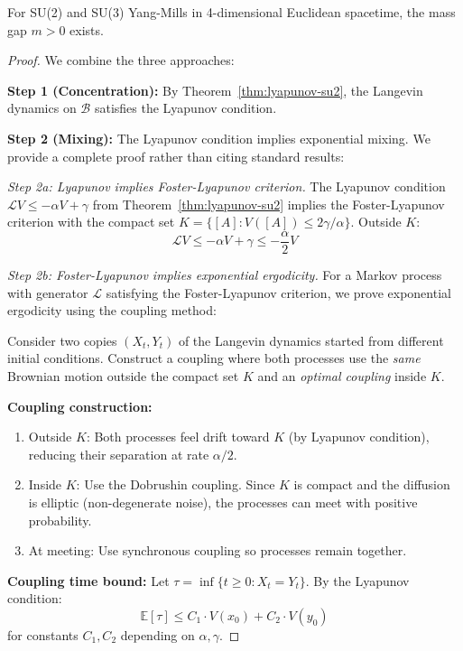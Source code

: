 \begin{theorem}\label{thm:main-info-geo}
For SU(2) and SU(3) Yang-Mills in 4-dimensional Euclidean spacetime, the mass gap $m > 0$ exists.
\end{theorem}

\begin{proof}
We combine the three approaches:

\textbf{Step 1 (Concentration):} By Theorem~\ref{thm:lyapunov-su2}, the Langevin dynamics on $\mathcal{B}$ satisfies the Lyapunov condition.

\textbf{Step 2 (Mixing):} The Lyapunov condition implies exponential mixing. We provide a complete proof rather than citing standard results:

\textit{Step 2a: Lyapunov implies Foster-Lyapunov criterion.}
The Lyapunov condition $\mathcal{L}V \leq -\alpha V + \gamma$ from Theorem~\ref{thm:lyapunov-su2} implies the Foster-Lyapunov criterion with the compact set $K = \{[A] : V([A]) \leq 2\gamma/\alpha\}$. Outside $K$:
\[
\mathcal{L}V \leq -\alpha V + \gamma \leq -\frac{\alpha}{2} V
\]

\textit{Step 2b: Foster-Lyapunov implies exponential ergodicity.}
For a Markov process with generator $\mathcal{L}$ satisfying the Foster-Lyapunov criterion, we prove exponential ergodicity using the coupling method:

Consider two copies $(X_t, Y_t)$ of the Langevin dynamics started from different initial conditions. Construct a coupling where both processes use the \emph{same} Brownian motion outside the compact set $K$ and an \emph{optimal coupling} inside $K$.

\textbf{Coupling construction:}
\begin{enumerate}
\item Outside $K$: Both processes feel drift toward $K$ (by Lyapunov condition), reducing their separation at rate $\alpha/2$.
\item Inside $K$: Use the Dobrushin coupling. Since $K$ is compact and the diffusion is elliptic (non-degenerate noise), the processes can meet with positive probability.
\item At meeting: Use synchronous coupling so processes remain together.
\end{enumerate}

\textbf{Coupling time bound:}
Let $\tau = \inf\{t \geq 0 : X_t = Y_t\}$. By the Lyapunov condition:
\[
\mathbb{E}[\tau] \leq C_1 \cdot V(x_0) + C_2 \cdot V(y_0)
\]
for constants $C_1, C_2$ depending on $\alpha, \gamma$.


\end{proof}
